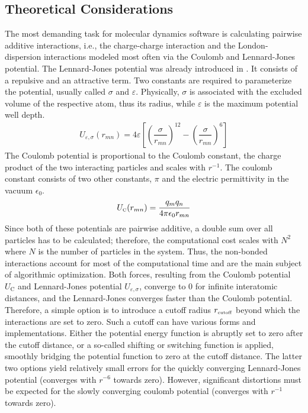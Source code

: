 \documentclass[9pt,tutorial]{livecoms}
\begin{document}
\subsection*{Theoretical Considerations}
The most demanding task for molecular dynamics software is calculating pairwise additive interactions, i.e., the charge-charge interaction and the London-dispersion interactions modeled most often via the Coulomb and Lennard-Jones potential. The Lennard-Jones potential was already introduced in . It consists of a repulsive and an attractive term. Two constants are required to parameterize the potential, usually called $\sigma$ and $\varepsilon$. Physically, $\sigma$ is associated with the excluded volume of the respective atom, thus its radius, while $\varepsilon$ is the maximum potential well depth.\cite{LennardJones1924}
\begin{align}
    U_{\varepsilon,\sigma}(r_{mn})= 4 \varepsilon \left [ {\left (\dfrac{\sigma}{r_{mn}} \right )}^{12}-{\left (\dfrac{\sigma}{r_{mn}} \right )}^{6} \right]
\end{align}
The Coulomb potential is proportional to the Coulomb constant, the charge product of the two interacting particles and scales with $r^{-1}$. The coulomb constant consists of two other constants, $\pi$ and the electric permittivity in the vacuum $\epsilon_0$.\cite{Griffiths2017}
\begin{align}
    U_\text{\tiny C}(r_{mn}) = \frac{q_m q_n}{4 \pi \epsilon_0 r_{mn}}
\end{align}
Since both of these potentials are pairwise additive, a double sum over all particles has to be calculated; therefore, the computational cost scales with $N^2$ where $N$ is the number of particles in the system. Thus, the non-bonded interactions account for most of the computational time and are the main subject of algorithmic optimization. Both forces, resulting from the Coulomb potential $U_\text{C}$ and Lennard-Jones potential $U_{\varepsilon,\sigma}$, converge to $0$ for infinite interatomic distances, and the Lennard-Jones converges faster than the Coulomb potential. Therefore, a simple option is to introduce a cutoff radius $r_\text{\tiny cutoff}$ beyond which the interactions are set to zero. Such a cutoff can have various forms and implementations. Either the potential energy function is abruptly set to zero after the cutoff distance, or a so-called shifting or switching function is applied, smoothly bridging the potential function to zero at the cutoff distance. The latter two options yield relatively small errors for the quickly converging Lennard-Jones potential (converges with $r^{-6}$ towards zero). However, significant distortions must be expected for the slowly converging coulomb potential (converges with $r^{-1}$ towards zero).\cite{Norberg2000}\\
\end{document}

